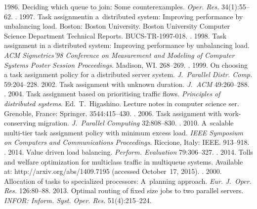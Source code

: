 \begin{multicols}{2}
{{\begin{thebibliography}{99}
     1986. Deciding which queue to join: Some counterexamples. 
\textit{Oper. Res.} 34(1):55--62.
    . 1997. Task assignmentin 
a~distributed system: Improving performance by unbalancing load. Boston:
Boston University. Boston University 
Computer Science Department Technical Reports. BUCS-TR-1997-018.
    . 1998. Task assignment in a 
distributed system: Improving performance by unbalancing load. \textit{ACM Sigmetrics'98 
Conference on Measurement and Modeling of Computer Systems Poster Session Proceedings}.  
Madison, WI. 268--269.
    . 1999. On choosing a task 
assignment policy for a distributed server system. \textit{J.~Parallel Distr. Comp.}  
59:204--228.
     2002. Task assignment with unknown duration. \textit{J.~ACM} 
49:260--288.
    . 2004. Task assignment based on 
prioritising traffic flows. \textit{Principles of distributed systems}.
Ed.\ T.~Higashino. Lecture notes in computer science ser.
 Grenoble, France:   Springer. 3544:415--430.
    . 2006. Task assignment with work-
conserving migration. \textit{J.~Parallel Computing} 32:808--830.
    . 2010. A~scalable multi-tier task 
assignment policy with minimum excess load. \textit{IEEE Symposium on Computers and 
Communications Proceedings}. Riccione, Italy: IEEE.  913--918.
    . 2014. Value 
driven load balancing. \textit{Perform. Evaluation} 79:306--327.
    . 2014. Tolls and welfare optimization for 
multiclass traffic in multiqueue systems. Available at: {\sf http://arxiv.org/abs/1409.7195} 
(accessed October~17, 2015).
    . 2000. 
Allocation of tasks to specialized processors: A~planning approach. \textit{Eur. 
J.~Oper. Res.} 126:80--88.
     2013. Optimal routing of fixed size jobs to two parallel 
servers. \textit{INFOR: Inform. Syst. Oper. Res.} 51(4):215--224.

\end{thebibliography}}}
\end{multicols}

